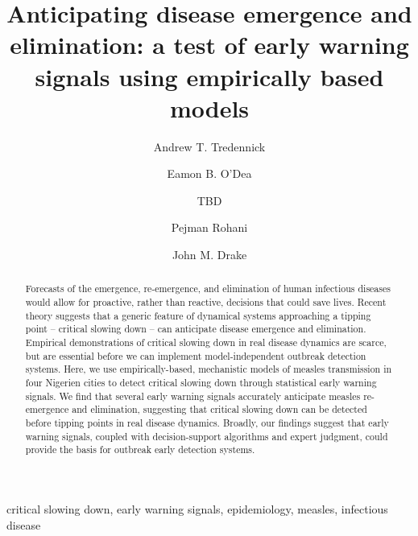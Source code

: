 \documentclass[3p]{elsarticle} %
\begin{document}
\begin{frontmatter}

  \title{Anticipating disease emergence and elimination: a test of early warning
signals using empirically based models}
    \author[UGA,CEID]{Andrew T. Tredennick}
    \author[UGA,CEID]{Eamon B. O'Dea}
  
    \author[other]{TBD}
  
    \author[UGA,CEID,ID]{Pejman Rohani}
  
    \author[UGA,CEID]{John M. Drake}
      \address[UGA]{Odum School of Ecology, University of Georgia, Athens, GA 30602, USA}
    \address[CEID]{Center for the Ecology of Infectious Diseases, University of Georgia,
Athens, GA 30602, USA}
    \address[other]{A University of Somewhere}
    \address[ID]{Department of Infectious Diseases, University of Georgia, Athens, GA
30602, USA}
    
  \begin{abstract}
  Forecasts of the emergence, re-emergence, and elimination of human
  infectious diseases would allow for proactive, rather than reactive,
  decisions that could save lives. Recent theory suggests that a generic
  feature of dynamical systems approaching a tipping point -- critical
  slowing down -- can anticipate disease emergence and elimination.
  Empirical demonstrations of critical slowing down in real disease
  dynamics are scarce, but are essential before we can implement
  model-independent outbreak detection systems. Here, we use
  empirically-based, mechanistic models of measles transmission in four
  Nigerien cities to detect critical slowing down through statistical
  early warning signals. We find that several early warning signals
  accurately anticipate measles re-emergence and elimination, suggesting
  that critical slowing down can be detected before tipping points in real
  disease dynamics. Broadly, our findings suggest that early warning
  signals, coupled with decision-support algorithms and expert judgment,
  could provide the basis for outbreak early detection systems.
  \end{abstract}
   \begin{keyword} critical slowing down, early warning signals, epidemiology, measles, infectious disease\end{keyword}
 \end{frontmatter}
\end{document}
